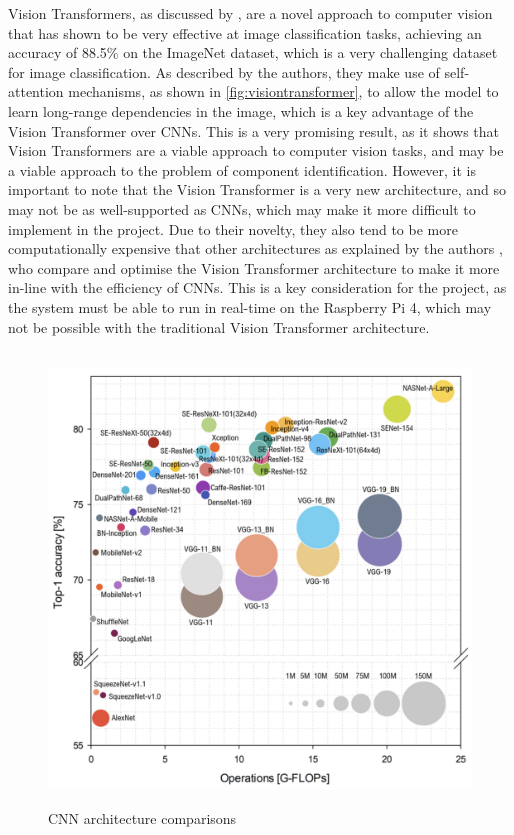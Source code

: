 Vision Transformers, as discussed by \citet{dosovitskiy2021image}, are a novel approach to computer vision that has shown to be very effective at image classification tasks, achieving an accuracy of 88.5\% on the ImageNet dataset, which is a very challenging dataset for image classification. As described by the authors, they make use of self-attention mechanisms, as shown in \autoref{fig:visiontransformer}, to allow the model to learn long-range dependencies in the image, which is a key advantage of the Vision Transformer over CNNs. This is a very promising result, as it shows that Vision Transformers are a viable approach to computer vision tasks, and may be a viable approach to the problem of component identification. However, it is important to note that the Vision Transformer is a very new architecture, and so may not be as well-supported as CNNs, which may make it more difficult to implement in the project. Due to their novelty, they also tend to be more computationally expensive that other architectures as explained by the authors \citet{li2022efficientformer}, who compare and optimise the Vision Transformer architecture to make it more in-line with the efficiency of CNNs. This is a key consideration for the project, as the system must be able to run in real-time on the Raspberry Pi 4, which may not be possible with the traditional Vision Transformer architecture.

\begin{figure}[H]
  \hfill
  \begin{minipage}[t]{\textwidth}
    \centering
    \includegraphics[height=12cm]{imgs/articles/cnncomparison.jpg}
    \caption{CNN architecture comparisons \cite{electronics11060945}}
    \label{fig:cnncomparison}
  \end{minipage}
\end{figure}

